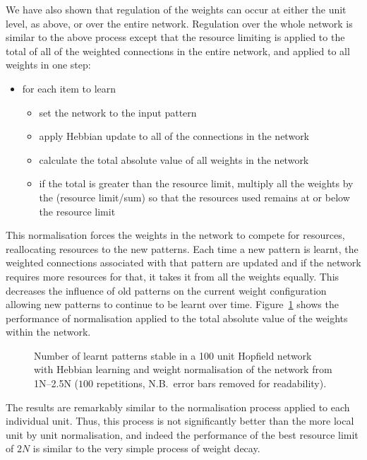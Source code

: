 We have also shown that regulation of the weights can occur at either the unit level, as above, or over the entire network.  Regulation over the whole network is similar to the above process except that the resource limiting is applied to the total of all of the weighted connections in the entire network, and applied to all weights in one step:
\begin{itemize}[topsep=1ex, leftmargin=1cm, labelsep=0.2cm, itemindent=0pt,label=\textbullet]
	\item for each item to learn
	\begin{itemize}[topsep=1ex, leftmargin=1cm, labelsep=0.2cm, itemindent=0pt,label=\textbullet]
		\item set the network to the input pattern
		\item apply Hebbian update to all of the connections in the network
		\item calculate the total absolute value of all weights in the network
		\item if the total is greater than the resource limit, multiply all the weights by the (resource limit/sum) so that the resources used remains at or below the resource limit
	\end{itemize}
\end{itemize}
This normalisation forces the weights in the network to compete for resources,  reallocating resources to the new patterns.  Each time a new pattern is learnt, the weighted connections associated with that pattern are updated and if the network requires more resources for that, it takes it from all the weights equally.  This decreases the influence of old patterns on the current weight configuration allowing new patterns to continue to be learnt over time.  Figure~\ref{fig:WeightNormNet100num} shows the performance of normalisation applied to the total absolute value of the weights within the network.

\begin{figure}[tbp]
\small
\center
		 
	\caption{Number of learnt patterns stable in a 100 unit Hopfield network  with Hebbian learning and weight normalisation of the network from 1N--2.5N ($100$ repetitions, N.B.\ error bars removed for readability).}
	\label{fig:WeightNormNet100num}
\end{figure}

The results are remarkably similar to the normalisation process applied to each individual unit.  Thus, this process is not significantly better than the more local unit by unit normalisation, and indeed the performance of the best resource limit of $2N$ is similar to the very simple process of weight decay.  

